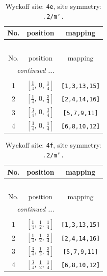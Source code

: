 \documentclass[fleqn,8pt]{jsarticle}
\begin{document}
\begin{longtable}{ccc}
\caption{Wyckoff site: {\tt 4e}, site symmetry: {\tt .2/m'.}}
 \\
 \hline \hline
No. & position & mapping \\ \hline \endfirsthead

\multicolumn{2}{l}{\tablename\ \thetable{}} \\
 \hline \hline
No. & position & mapping \\ \hline \endhead

 \hline \hline
\multicolumn{2}{r}{\footnotesize\it continued ...} \\ \endfoot

 \hline \hline
\multicolumn{2}{r}{} \\ \endlastfoot

1 & $\left[ \frac{1}{4},\, 0,\, \frac{1}{4} \right]$ & {\tt [1,3,13,15]} \\ \hline
2 & $\left[ \frac{1}{4},\, 0,\, \frac{3}{4} \right]$ & {\tt [2,4,14,16]} \\ \hline
3 & $\left[ \frac{3}{4},\, 0,\, \frac{3}{4} \right]$ & {\tt [5,7,9,11]} \\ \hline
4 & $\left[ \frac{3}{4},\, 0,\, \frac{1}{4} \right]$ & {\tt [6,8,10,12]} \\
\end{longtable}
\renewcommand{\arraystretch}{1.2}
\begin{longtable}{ccc}
\caption{Wyckoff site: {\tt 4f}, site symmetry: {\tt .2/m'.}}
 \\
 \hline \hline
No. & position & mapping \\ \hline \endfirsthead

\multicolumn{2}{l}{\tablename\ \thetable{}} \\
 \hline \hline
No. & position & mapping \\ \hline \endhead

 \hline \hline
\multicolumn{2}{r}{\footnotesize\it continued ...} \\ \endfoot

 \hline \hline
\multicolumn{2}{r}{} \\ \endlastfoot

1 & $\left[ \frac{1}{4},\, \frac{1}{2},\, \frac{1}{4} \right]$ & {\tt [1,3,13,15]} \\ \hline
2 & $\left[ \frac{1}{4},\, \frac{1}{2},\, \frac{3}{4} \right]$ & {\tt [2,4,14,16]} \\ \hline
3 & $\left[ \frac{3}{4},\, \frac{1}{2},\, \frac{3}{4} \right]$ & {\tt [5,7,9,11]} \\ \hline
4 & $\left[ \frac{3}{4},\, \frac{1}{2},\, \frac{1}{4} \right]$ & {\tt [6,8,10,12]} \\
\end{longtable}
\end{document}
